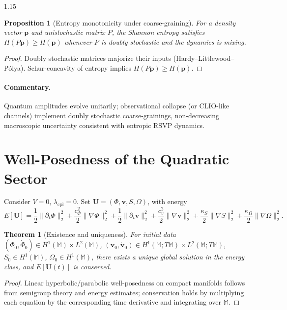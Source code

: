 \documentclass[12pt,a4paper]{article}
\numberwithin{equation}{section}
\theoremstyle{definition}
\theoremstyle{plain}
\newtheorem{theorem}{Theorem}[section]
\newtheorem{proposition}{Proposition}[section]
\theoremstyle{remark}
\newcommand{\M}{\mathbb{M}}
\begin{document}
\begin{spacing}{1.15}
\begin{proposition}[Entropy monotonicity under coarse-graining]\label{prop:unistochastic}
For a density vector $\mathbf{p}$ and unistochastic matrix $P$, the Shannon entropy satisfies $H(P\mathbf{p})\ge H(\mathbf{p})$ whenever $P$ is doubly stochastic and the dynamics is mixing.
\end{proposition}
\begin{proof}
Doubly stochastic matrices majorize their inputs (Hardy–Littlewood–Pólya). Schur-concavity of entropy implies $H(P\mathbf{p})\ge H(\mathbf{p})$.
\end{proof}

\paragraph{Commentary.}
Quantum amplitudes evolve unitarily; observational collapse (or CLIO-like channels) implement doubly stochastic coarse-grainings, non-decreasing macroscopic uncertainty consistent with entropic RSVP dynamics.

\section{Well-Posedness of the Quadratic Sector}\label{sec:wellposed}
Consider $V=0$, $\lambda_\mathrm{cpl}=0$. Set $\mathbf{U}=(\Phi,\mathbf{v},S,\Omega)$, with energy
\[
E[\mathbf{U}]=\frac{1}{2}\|\partial_t \Phi\|_2^2+\frac{c_\Phi^2}{2}\|\nabla\Phi\|_2^2
+\frac{1}{2}\|\partial_t \mathbf{v}\|_2^2+\frac{c_v^2}{2}\|\nabla\mathbf{v}\|_2^2
+\frac{\kappa_S}{2}\|\nabla S\|_2^2+\frac{\kappa_\Omega}{2}\|\nabla \Omega\|_2^2.
\]

\begin{theorem}[Existence and uniqueness]\label{thm:existence}
For initial data $(\Phi_0,\dot{\Phi}_0)\in H^1(\M)\times L^2(\M)$, $(\mathbf{v}_0,\dot{\mathbf{v}}_0)\in H^1(\M;T\M)\times L^2(\M;T\M)$, $S_0\in H^1(\M)$, $\Omega_0\in H^1(\M)$, there exists a unique global solution in the energy class, and $E[\mathbf{U}(t)]$ is conserved.
\end{theorem}
\begin{proof}
Linear hyperbolic/parabolic well-posedness on compact manifolds follows from semigroup theory and energy estimates; conservation holds by multiplying each equation by the corresponding time derivative and integrating over $\M$.
\end{proof}


\end{spacing}
\end{document}
